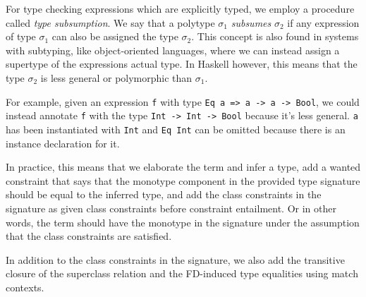 For type checking expressions which are explicitly typed, we employ a procedure
called \textit{type subsumption}. We say that a polytype $\sigma_1$
\textit{subsumes} $\sigma_2$ if any expression of type $\sigma_1$ can also be
assigned the type $\sigma_2$. This concept is also found in systems with
subtyping, like object-oriented languages, where we can instead assign a
supertype of the expressions actual type. In Haskell however, this means that
the type $\sigma_2$ is less general or polymorphic than $\sigma_1$.

For example, given an expression \texttt{f} with type \texttt{Eq a => a -> a ->
Bool}, we could instead annotate \texttt{f} with the type \texttt{Int -> Int ->
Bool} because it's less general. \texttt{a} has been instantiated with
\texttt{Int} and \texttt{Eq Int} can be omitted because there is an instance
declaration for it.

In practice, this means that we elaborate the term and infer a type, add a
wanted constraint that says that the monotype component in the provided type
signature should be equal to the inferred type, and add the class constraints in
the signature as given class constraints before constraint entailment. Or in
other words, the term should have the monotype in the signature under the
assumption that the class constraints are satisfied.

In addition to the class constraints in the signature, we also add the
transitive closure of the superclass relation and the FD-induced type equalities
using match contexts.
